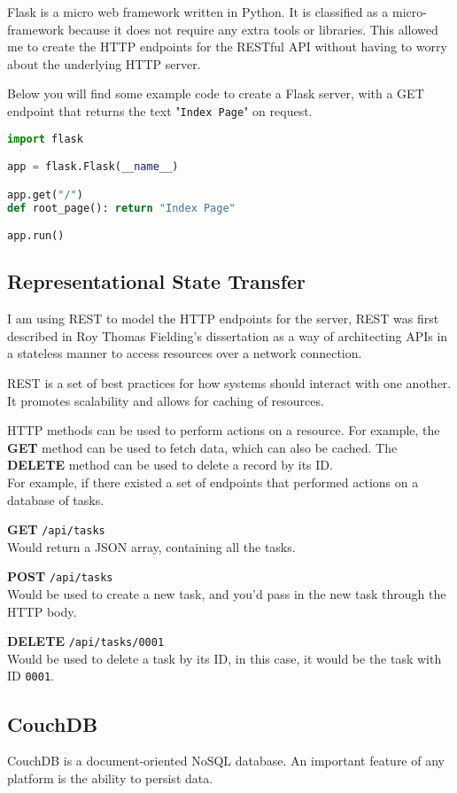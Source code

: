 Flask is a micro web framework written in Python.
It is classified as a micro-framework because it does
not require any extra tools or libraries.
This allowed me to create the HTTP endpoints for the RESTful API without
having to worry about the underlying HTTP server.

Below you will find some example code to create a Flask server,
with a GET endpoint that returns the text "\texttt{Index Page}" on request.

\begin{lstlisting}[language=Python]
import flask

app = flask.Flask(__name__)

app.get("/")
def root_page(): return "Index Page"

app.run()
\end{lstlisting}

\subsection{Representational State Transfer}
I am using REST to model the HTTP endpoints for the server,
REST was first described in Roy Thomas Fielding's dissertation \cite{REST}
as a way of architecting APIs in a stateless manner to
access resources over a network connection.

REST is a set of best practices for how systems should interact with one another.
It promotes scalability and allows for caching of resources.

HTTP methods can be used to perform actions on a resource.
For example, the \textbf{GET} method can be used to fetch data,
which can also be cached.
The \textbf{DELETE} method can be used to delete a record by its ID. \\

For example, if there existed a set of endpoints that
performed actions on a database of tasks.

\textbf{GET} \texttt{/api/tasks} \\
Would return a JSON array, containing all the tasks.

\textbf{POST} \texttt{/api/tasks} \\
Would be used to create a new task,
and you'd pass in the new task through the HTTP body.

\textbf{DELETE} \texttt{/api/tasks/0001} \\
Would be used to delete a task by its ID,
in this case, it would be the task with ID \texttt{0001}.

\subsection{CouchDB}
CouchDB is a document-oriented NoSQL database.
An important feature of any platform is the ability to persist data.

